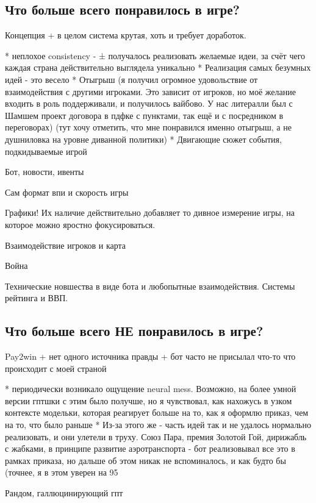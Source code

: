 \subsection{Что больше всего понравилось в игре?}

Концепция + в целом система крутая, хоть и требует доработок.

* неплохое consistency - ± получалось реализовать желаемые идеи, за счёт чего каждая страна действительно выглядела уникально
* Реализация самых безумных идей - это весело
* Отыгрыш (я получил огромное удовольствие от взаимодействия с другими игроками. Это зависит от игроков, но моё желание входить в роль поддерживали, и получилось вайбово. У нас литералли был с Шамшем проект договора в пдфке с пунктами, так ещё и с посредником в переговорах) (тут хочу отметить, что мне понравился именно отыгрыш, а не душниловка на уровне диванной политики)
* Двигающие сюжет события, подкидываемые игрой

Бот, новости, ивенты

Сам формат впи и скорость игры

Графики! Их наличие действительно добавляет то дивное измерение игры, на которое можно яростно фокусироваться.

Взаимодействие игроков и карта

Война

Технические новшества в виде бота и любопытные взаимодействия. Системы рейтинга и ВВП.

\subsection{Что больше всего НЕ понравилось в игре?}
Pay2win + нет одного источника правды + бот часто не присылал что-то что происходит с моей страной

* периодически возникало ощущение neural mess. Возможно, на более умной версии гптшки с этим было получше, но я чувствовал, как нахожусь в узком контексте модельки, которая реагирует больше на то, как я оформлю приказ, чем на то, что было раньше
* Из-за этого же - часть идей так и не удалось нормально реализовать, и они улетели в труху. Союз Пара, премия Золотой Гой, дирижабль с жабками, в принципе развитие аэротранспорта - бот реализовывал все это в рамках приказа, но дальше об этом никак не вспоминалось, и как будто бы (точнее, я в этом уверен на 95%

Рандом, галлюцинирующий гпт

